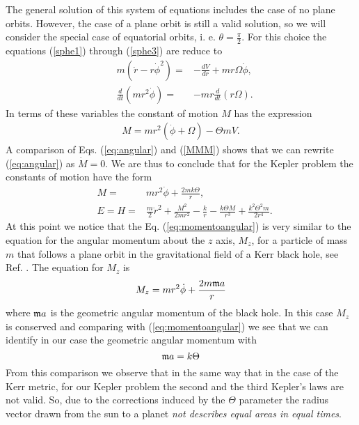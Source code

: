 \documentclass[a4paper,12pt]{article}
\begin{document}
The general solution of this system of equations  includes the
case of no plane orbits. However, the case of a plane orbit is
still a valid solution, so we will consider the special case of
equatorial orbits, i. e. $\theta =\frac{\pi}{2}$. For this choice
the equations (\ref{sphe1}) through (\ref{sphe3}) are reduce to
\begin{eqnarray}
&m(\ddot r -r\dot \phi^{2})=&-\frac{dV}{dr}+mr\Omega\dot \phi, \\
&\frac{d}{dt}(mr^{2}\dot \phi )=&-mr\frac{d}{dt}(r\Omega). \label{eq:angular}
\end{eqnarray}
In terms of these variables the constant of motion $M$ has the
expression
\begin{eqnarray}
M=mr^{2}(\dot \phi +\Omega)- \Theta mV. \label{MMM}
\end{eqnarray}
A comparison of Eqs. (\ref{eq:angular}) and (\ref{MMM}) shows that
we can rewrite (\ref{eq:angular}) as $\dot M =0$. We are thus to
conclude that for the Kepler problem the constants of motion have
the form
\begin{eqnarray}
&M=&mr^{2}\dot \phi +\frac{2mk\Theta }{r},\label{eq:momentoangular}\\
&E=H=&\frac{m}{2}\dot r^{2}+\frac{M^{2}}{2mr^{2}}-\frac{k}{r}-\frac{k\Theta M}{r^{3}}
+\frac{k^{2}\Theta^{2}m}{2r^{4}}.
\end{eqnarray}
At this point we notice that the Eq. (\ref{eq:momentoangular}) is
very similar to the equation for the angular momentum about the
$z$ axis, $M_z$,  for a particle of mass $m$ that follows a plane
orbit in the gravitational field of a Kerr black hole, see Ref.
\cite{Adler}. The equation for $M_z$ is
\begin{equation}\label{kerrbh}
  M_z = mr^2 \dot \phi + \frac{2m{\frak m}a}{r}
\end{equation}
where ${\frak m}a$ is the geometric angular momentum of the black
hole. In this case $M_z$ is conserved and comparing with
(\ref{eq:momentoangular}) we see that we can identify in our case
the geometric angular momentum with
\begin{equation}\label{compa}
{\frak m}a = k \Theta
\end{equation}
From this comparison we observe that in the same way that in the
case of the Kerr metric, for our Kepler problem the second and the
third Kepler's laws are not valid. So, due to the corrections
induced by the $\Theta$ parameter the radius vector drawn from the
sun to a planet {\it not describes equal areas in equal times}.
\end{document}
